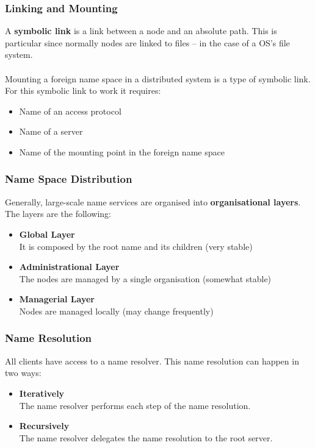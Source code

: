 \documentclass{article}
\begin{document}
\subsubsection{Linking and Mounting}
A \textbf{symbolic link} is a link between a node and an absolute path. This is particular since normally nodes are linked to files -- in the case of a OS's file system. \\ \\
Mounting a foreign name space in a distributed system is a type of symbolic link. For this symbolic link to work it requires:

\begin{itemize}
	\item Name of an access protocol
	\item Name of a server
	\item Name of the mounting point in the foreign name space
\end{itemize}

\subsubsection{Name Space Distribution}
Generally, large-scale name services are organised into \textbf{organisational layers}. The layers are the following:

\begin{itemize}
	\item \textbf{Global Layer} \\
	It is composed by the root name and its children (very stable)
	
	\item \textbf{Administrational Layer} \\
	The nodes are managed by a single organisation (somewhat stable)
	
	\item \textbf{Managerial Layer} \\
	Nodes are managed locally (may change frequently)
\end{itemize}

\subsubsection{Name Resolution}
All clients have access to a name resolver. This name resolution can happen in two ways:

\begin{itemize}
	\item \textbf{Iteratively} \\
	The name resolver performs each step of the name resolution.
	
	\item \textbf{Recursively} \\
	The name resolver delegates the name resolution to the root server.  
\end{itemize}
\end{document}
